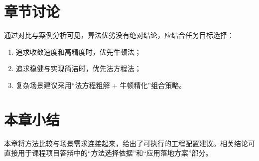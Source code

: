 \section{章节讨论}
通过对比与案例分析可见，算法优劣没有绝对结论，应结合任务目标选择：
\begin{enumerate}
  \item 追求收敛速度和高精度时，优先牛顿法；
  \item 追求稳健与实现简洁时，优先法方程法；
  \item 复杂场景建议采用“法方程粗解 + 牛顿精化”组合策略。
\end{enumerate}

\section{本章小结}
本章将方法比较与场景需求连接起来，给出了可执行的工程配置建议。相关结论可直接用于课程项目答辩中的“方法选择依据”和“应用落地方案”部分。
